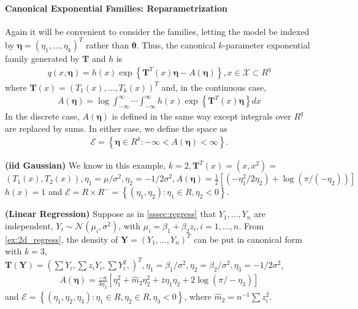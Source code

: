 \documentclass{article}
\newcommand{\bfs}[1]{\textbf{({#1}) }}
\begin{document}
\paragraph{Canonical Exponential Families: Reparametrization}\label{sec:cano_exp}
Again it will be convenient to consider the  families, letting the model be indexed by $\boldsymbol{\eta}=\left(\eta_{1}, \ldots, \eta_{k}\right)^{T}$ rather than $\boldsymbol{\theta}$. Thus, the canonical $k$-parameter exponential family generated by $\mathbf{T}$ and $h$ is
\begin{align}
q(x, \boldsymbol{\eta})=h(x) \exp \left\{\mathbf{T}^{T}(x) \boldsymbol{\eta}-A(\boldsymbol{\eta})\right\}, x \in \mathcal{X} \subset R^{q}\label{eq:mul_exp_den}
\end{align}
where $\mathbf{T}(x)=\left(T_{1}(x), \ldots, T_{k}(x)\right)^{T}$ and, in the continuous case,
\begin{align*}
A(\boldsymbol{\eta})=\log \int_{-\infty}^{\infty} \cdots \int_{-\infty}^{\infty} h(x) \exp \left\{\mathbf{T}^{T}(x) \boldsymbol{\eta}\right\} d x
\end{align*}
In the discrete case, $A(\boldsymbol{\eta})$ is defined in the same way except integrals over $R^{q}$ are replaced by sums. In either case, we define the  space as
\begin{align*}
\mathcal{E}=\left\{\boldsymbol{\eta} \in R^{k}:-\infty<A(\boldsymbol{\eta})<\infty\right\} .
\end{align*}
\begin{exma}\bfs{\gls{iid} Gaussian}\label{ex:iid_gaussian_2}
We know in this example, $k=2, \mathbf{T}^{T}(x)=\left(x, x^{2}\right)=$ $\left(T_{1}(x), T_{2}(x)\right), \eta_{1}=\mu / \sigma^{2}, \eta_{2}=-1 / 2 \sigma^{2}, A(\boldsymbol{\eta})=\frac{1}{2}\left[\left(-\eta_{1}^{2} / 2 \eta_{2}\right)+\log \left(\pi /\left(-\eta_{2}\right)\right)\right]$ $h(x)=1$ and $\mathcal{E}=R \times R^{-}=\left\{\left(\eta_{1}, \eta_{2}\right): \eta_{1} \in R, \eta_{2}<0\right\} .$
\end{exma} 
\begin{exma}\bfs{Linear Regression}
 Suppose as in \cref{sssec:regress} that $Y_{1}, \ldots, Y_{n}$ are independent, $Y_{i} \sim \mathcal{N}\left(\mu_{i}, \sigma^{2}\right)$, with $\mu_{i}=\beta_{1}+\beta_{2} z_{i}, i=1, \ldots, n$. From \cref{ex:2d_regress}, the density of $\mathbf{Y}=\left(Y_{1}, \ldots, Y_{n}\right)^{T}$ can be put in canonical form with $k=3$, $\mathbf{T}(\mathbf{Y})=\left(\sum Y_{i}, \sum z_{i} Y_{i}, \sum Y_{i}^{2},\right)^{T}, \eta_{1}=\beta_{1} / \sigma^{2}, \eta_{2}=\beta_{2} / \sigma^{2}, \eta_{3}=-1 / 2 \sigma^{2}$,
\begin{align*}
A(\boldsymbol{\eta})=\frac{-n}{4 \eta_{3}}\left[\eta_{1}^{2}+\widehat{m}_{2} \eta_{2}^{2}+\bar{z} \eta_{1} \eta_{2}+2 \log \left(\pi /-\eta_{3}\right)\right]
\end{align*}
and $\mathcal{E}=\left\{\left(\eta_{1}, \eta_{2}, \eta_{3}\right): \eta_{1} \in R, \eta_{2} \in R, \eta_{3}<0\right\}$, where $\widehat{m}_{2}=n^{-1} \sum z_{i}^{2}$.
\end{exma} 
\end{document}
